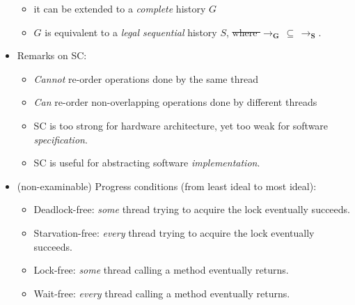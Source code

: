 \documentclass[twocolumn,landscape,10pt]{article}
\theoremstyle{definition}
\begin{document}
\begin{itemize}
        \begin{itemize}
            \item it can be extended to a \emph{complete} history $G$
            \item $G$ is equivalent to a \emph{legal sequential} history $S$,
                \sout{where $\pmb{\rightarrow_G}\,\subseteq\,\pmb{\rightarrow_S}$}.
        \end{itemize} 
    \item Remarks on SC:
        \begin{itemize}
            \item \emph{Cannot} re-order operations done by the same thread
            \item \emph{Can} re-order non-overlapping operations done by
                different threads
            \item SC is too strong for hardware architecture, 
                yet too weak for software \emph{specification}.
            \item SC is useful for abstracting software \emph{implementation}.
        \end{itemize} 
    \item (non-examinable) Progress conditions (from least ideal to most ideal):
        \begin{itemize}
            \item Deadlock-free: \emph{some} thread trying to acquire the lock
                eventually succeeds.
            \item Starvation-free: \emph{every} thread trying to acquire the lock
                eventually succeeds.
            \item Lock-free: \emph{some} thread calling a method
                eventually returns.
            \item Wait-free: \emph{every} thread calling a method
                eventually returns.
        \end{itemize} 
\end{itemize} 
\end{document}
